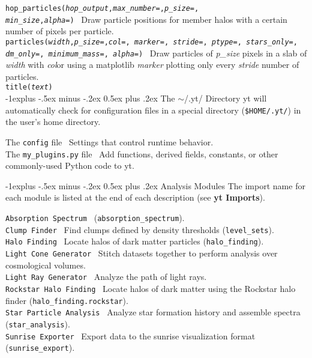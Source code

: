 \documentclass[10pt,landscape]{article}
\makeatletter
\renewcommand{\subsection}{\@startsection{subsection}{2}{0mm}%
                                {-1explus -.5ex minus -.2ex}%
                                {0.5ex plus .2ex}%
                                {\normalfont\normalsize\bfseries}}
\makeatother
\begin{document}
\begin{multicols}{3}
\texttt{hop\_particles(\textit{hop\_output},\textit{max\_number=},\textit{p\_size=},\\
\textit{min\_size},\textit{alpha=})} \textemdash\ Draw particle positions for member halos with a certain number of pixels per particle.\\
\texttt{particles(\textit{width},\textit{p\_size=},\textit{col=}, \textit{marker=}, \textit{stride=}, \textit{ptype=}, \textit{stars\_only=}, \textit{dm\_only=}, \textit{minimum\_mass=}, \textit{alpha=})}  \textemdash\  Draw particles of \textit{p\_size} pixels in a slab of \textit{width} with \textit{col}or using a matplotlib \textit{marker} plotting only every \textit{stride} number of particles.\\
\texttt{title(\textit{text})}\\

\subsection{The $\sim$/.yt/ Directory}
yt will automatically check for configuration files in a special directory (\texttt{\$HOME/.yt/}) in the user's home directory.

The \texttt{config} file \textemdash\ Settings that control runtime behavior. \\
The \texttt{my\_plugins.py} file \textemdash\ Add functions, derived fields, constants, or other commonly-used Python code to yt.


\subsection{Analysis Modules}
The import name for each module is listed at the end of each description (see \textbf{yt Imports}).

\texttt{Absorption Spectrum} \textemdash\ (\texttt{absorption\_spectrum}). \\
\texttt{Clump Finder} \textemdash\ Find clumps defined by density thresholds (\texttt{level\_sets}). \\
\texttt{Halo Finding} \textemdash\ Locate halos of dark matter particles (\texttt{halo\_finding}). \\
\texttt{Light Cone Generator} \textemdash\ Stitch datasets together to perform analysis over cosmological volumes. \\
\texttt{Light Ray Generator} \textemdash\ Analyze the path of light rays.\\
\texttt{Rockstar Halo Finding} \textemdash\ Locate halos of dark matter using the Rockstar halo finder (\texttt{halo\_finding.rockstar}). \\
\texttt{Star Particle Analysis} \textemdash\ Analyze star formation history and assemble spectra (\texttt{star\_analysis}). \\
\texttt{Sunrise Exporter} \textemdash\ Export data to the sunrise visualization format (\texttt{sunrise\_export}). \\



\end{multicols}
\end{document}
